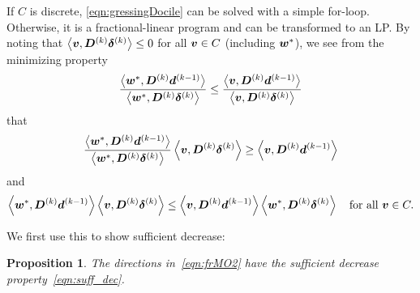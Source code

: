 \documentclass{article}
\theoremstyle{plain}
\newtheorem{proposition}[theorem]{Proposition}
\theoremstyle{definition}
\begin{document}
If $C$ is discrete, \eqref{eqn:gressingDocile} can be solved with a simple for-loop.
Otherwise, it is a fractional-linear program and can be transformed to an LP.
By noting that $\left\langle \bm{v}, \bm{D}^{(k)}\bm{\delta}^{(k)} \right\rangle\leq 0$ for all $\bm{v} \in C$ (including $\bm{w}^*$),
we see from the minimizing property 
$$
\frac{
	\left\langle \bm{w}^*, \bm{D}^{(k)} \bm{d}^{(k-1)} \right\rangle
}{
	\left\langle \bm{w}^*, \bm{D}^{(k)} \bm{\delta}^{(k)} \right\rangle
}
\leq
\frac{
	\left\langle \bm{v}, \bm{D}^{(k)} \bm{d}^{(k-1)} \right\rangle
}{
	\left\langle \bm{v}, \bm{D}^{(k)} \bm{\delta}^{(k)} \right\rangle
}
$$
that
$$
\frac{
	\left\langle \bm{w}^*, \bm{D}^{(k)} \bm{d}^{(k-1)} \right\rangle
}{
	\left\langle \bm{w}^*, \bm{D}^{(k)} \bm{\delta}^{(k)} \right\rangle
}
	\left\langle \bm{v}, \bm{D}^{(k)} \bm{\delta}^{(k)} \right\rangle
\geq
	\left\langle \bm{v}, \bm{D}^{(k)} \bm{d}^{(k-1)} \right\rangle
$$
and
\begin{equation}
	\left\langle \bm{w}^*, \bm{D}^{(k)} \bm{d}^{(k-1)} \right\rangle
	\left\langle \bm{v}, \bm{D}^{(k)} \bm{\delta}^{(k)} \right\rangle
\leq
	\left\langle \bm{v}, \bm{D}^{(k)} \bm{d}^{(k-1)} \right\rangle
	\left\langle \bm{w}^*, \bm{D}^{(k)} \bm{\delta}^{(k)} \right\rangle
\quad\text{for all $\bm{v} \in C.$}
\label{eqn:crozersFilfot}
\end{equation}

We first use this to show sufficient decrease:
\begin{proposition}
	The directions in~\eqref{eqn:frMO2} have the 
	sufficient decrease property~\eqref{eqn:suff_dec}.
\end{proposition}
\end{document}
